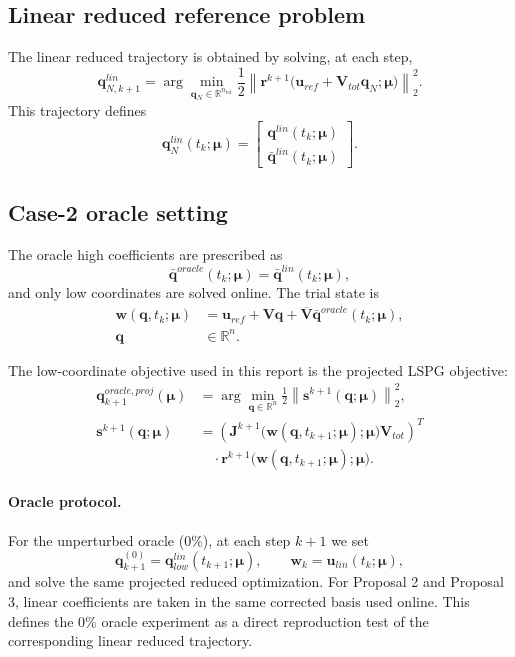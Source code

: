 \documentclass[11pt]{article}
\begin{document}
\subsection*{Linear reduced reference problem}
The linear reduced trajectory is obtained by solving, at each step,
\[
\mathbf q_{N,k+1}^{lin}
=\arg\min_{\mathbf q_N\in\mathbb R^{n_{\mathrm{tot}}}}
\frac12\left\|\mathbf r^{k+1}\big(\mathbf u_{ref}+\mathbf V_{tot}\mathbf q_N;\bm\mu\big)\right\|_2^2.
\]
This trajectory defines
\[
\mathbf q_N^{lin}(t_k;\bm\mu)=
\begin{bmatrix}
\mathbf q^{lin}(t_k;\bm\mu)\\
\bar{\mathbf q}^{lin}(t_k;\bm\mu)
\end{bmatrix}.
\]

\subsection*{Case-2 oracle setting}
The oracle high coefficients are prescribed as
\[
\bar{\mathbf q}^{oracle}(t_k;\bm\mu)=\bar{\mathbf q}^{lin}(t_k;\bm\mu),
\]
and only low coordinates are solved online.
The trial state is
\[
\begin{aligned}
\mathbf w(\mathbf q,t_k;\bm\mu)
&=\mathbf u_{ref}+\mathbf V\mathbf q
+\overline{\mathbf V}\bar{\mathbf q}^{oracle}(t_k;\bm\mu),\\
\mathbf q&\in\mathbb R^{n}.
\end{aligned}
\]

The low-coordinate objective used in this report is the projected LSPG objective:
\[
\begin{aligned}
\mathbf q_{k+1}^{oracle,proj}(\bm\mu)
&=\arg\min_{\mathbf q\in\mathbb R^{n}}
\frac12\left\|\mathbf s^{k+1}(\mathbf q;\bm\mu)\right\|_2^2,\\
\mathbf s^{k+1}(\mathbf q;\bm\mu)
&=\left(\mathbf J^{k+1}\big(\mathbf w(\mathbf q,t_{k+1};\bm\mu);\bm\mu\big)\mathbf V_{tot}\right)^T\\
&\quad\cdot\mathbf r^{k+1}\big(\mathbf w(\mathbf q,t_{k+1};\bm\mu);\bm\mu\big).
\end{aligned}
\]

\paragraph{Oracle protocol.}
For the unperturbed oracle (\(0\%\)), at each step \(k+1\) we set
\[
\mathbf q_{k+1}^{(0)}=\mathbf q_{low}^{lin}(t_{k+1};\bm\mu),
\qquad
\mathbf w_k=\mathbf u_{lin}(t_k;\bm\mu),
\]
and solve the same projected reduced optimization.
For Proposal 2 and Proposal 3, linear coefficients are taken in the same corrected basis used online.
This defines the \(0\%\) oracle experiment as a direct reproduction test of the corresponding linear reduced trajectory.
\end{document}
